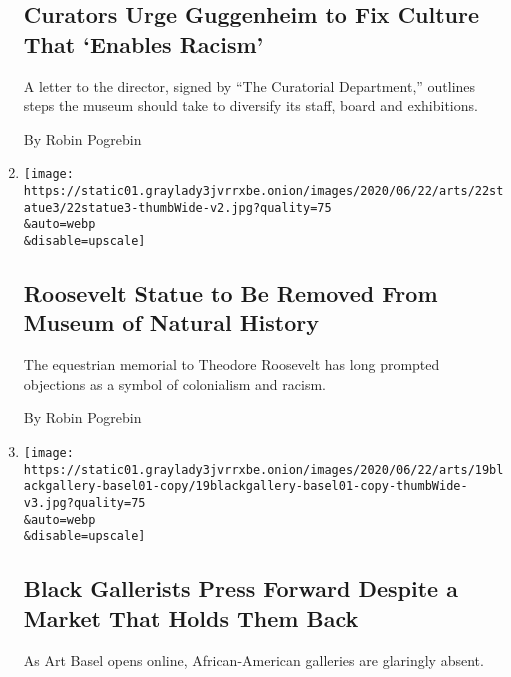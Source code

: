 \begin{enumerate}
  \hypertarget{curators-urge-guggenheim-to-fix-culture-that-enables-racism}{%
  \subsection{Curators Urge Guggenheim to Fix Culture That `Enables
  Racism'}\label{curators-urge-guggenheim-to-fix-culture-that-enables-racism}}

  A letter to the director, signed by ``The Curatorial Department,''
  outlines steps the museum should take to diversify its staff, board
  and exhibitions.

  By Robin Pogrebin
\item
  \href{/2020/06/21/arts/design/roosevelt-statue-to-be-removed-from-museum-of-natural-history.html}{}

  \texttt{[image: https://static01.graylady3jvrrxbe.onion/images/2020/06/22/arts/22statue3/22statue3-thumbWide-v2.jpg?quality=75\\\&auto=webp\\\&disable=upscale]}

  \hypertarget{roosevelt-statue-to-be-removed-from-museum-of-natural-history}{%
  \subsection{Roosevelt Statue to Be Removed From Museum of Natural
  History}\label{roosevelt-statue-to-be-removed-from-museum-of-natural-history}}

  The equestrian memorial to Theodore Roosevelt has long prompted
  objections as a symbol of colonialism and racism.

  By Robin Pogrebin
\item
  \href{/2020/06/21/arts/design/art-basel-black-owned-galleries.html}{}

  \texttt{[image: https://static01.graylady3jvrrxbe.onion/images/2020/06/22/arts/19blackgallery-basel01-copy/19blackgallery-basel01-copy-thumbWide-v3.jpg?quality=75\\\&auto=webp\\\&disable=upscale]}

  \hypertarget{black-gallerists-press-forward-despite-a-market-that-holds-them-back}{%
  \subsection{Black Gallerists Press Forward Despite a Market That Holds
  Them
  Back}\label{black-gallerists-press-forward-despite-a-market-that-holds-them-back}}

  As Art Basel opens online, African-American galleries are glaringly
  absent.


\end{enumerate}

